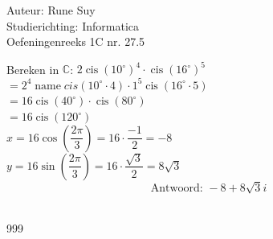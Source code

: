 \documentclass[a4paper]{article}
\newcommand{\degree}{^{\circ}}
\newcommand{\cis}{\operatorname{cis}}
\newcommand{\C}{\mathbb{C}}
\begin{document}
  
\noindent \large Auteur: Rune Suy \\
\noindent \large Studierichting: Informatica\\
\noindent \large Oefeningenreeks 1C nr. 27.5\\

\medskip

\normalsize

Bereken in $\C$: $ 2\cis(10\degree)^4 \cdot \cis(16\degree)^5 $\\

$ = 2^4 \operatorname{name}{cis}(10\degree \cdot 4)  \cdot 1^5 \operatorname{cis}(16\degree \cdot 5)$\\

$ = 16\operatorname{cis}(40\degree) \cdot \operatorname{cis}(80\degree) $\\

$ = 16 \cis(120\degree) $\\ 

$ x = 16\cos \left(\dfrac{2\pi}{3}\right) = 16 \cdot \dfrac{-1}{2} = -8 $\\

$ y = 16\sin\left(\dfrac{2\pi}{3}\right) = 16 \cdot \dfrac{\sqrt{3}}{2} = 8\sqrt{3} $\\

$$ \text{Antwoord: } -8 + 8\sqrt{3}i $$\\

\begin{thebibliography}{999}
\end{thebibliography}
\end{document}
